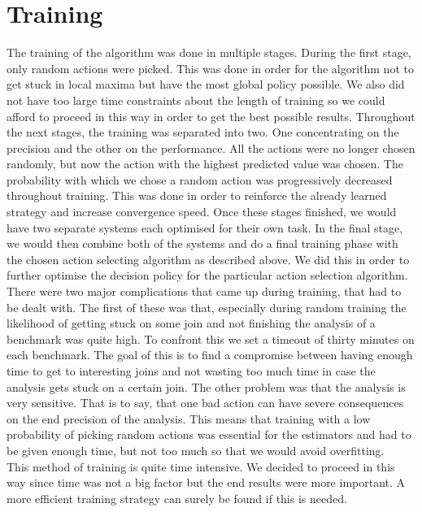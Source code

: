 \section{Training}

The training of the algorithm was done in multiple stages. During the first stage, only random actions were picked. This was done in order for the algorithm not to get stuck in local maxima but have the most global policy possible. We also did not have too large time constraints about the length of training so we could afford to proceed in this way in order to get the best possible results. Throughout the next stages, the training was separated into two. One concentrating on the precision and the other on the performance. All the actions were no longer chosen randomly, but now the action with the highest predicted value was chosen. The probability with which we chose a random action was progressively decreased throughout training. This was done in order to reinforce the already learned strategy and increase convergence speed. Once these stages finished, we would have two separate systems each optimised for their own task. In the final stage, we would then combine both of the systems and do a final training phase with the chosen action selecting algorithm as described above. We did this in order to further optimise the decision policy for the particular action selection algorithm.\\
There were two major complications that came up during training, that had to be dealt with. The first of these was that, especially during random training the likelihood of getting stuck on some join and not finishing the analysis of a benchmark was quite high. To confront this we set a timeout of thirty minutes on each benchmark. The goal of this is to find a compromise between having enough time to get to interesting joins and not wasting too much time in case the analysis gets stuck on a certain join. The other problem was that the analysis is very sensitive. That is to say, that one bad action can have severe consequences on the end precision of the analysis. This means that training with a low probability of picking random actions was essential for the estimators and had to be given enough time, but not too much so that we would avoid overfitting.\\
This method of training is quite time intensive. We decided to proceed in this way since time was not a big factor but the end results were more important. A more efficient training strategy can surely be found if this is needed.



















